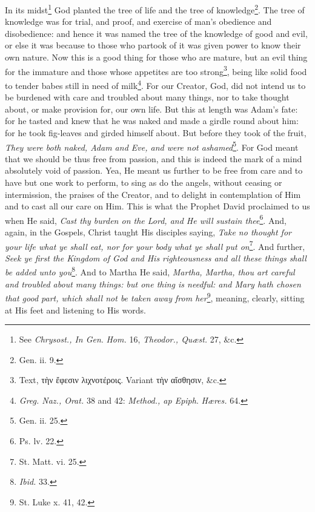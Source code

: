 In its midst\footnote{See \emph{Chrysost., In Gen}. \emph{Hom. }16, \emph{Theodor., Quæst.} 27, \&c.} God planted the tree of life and the tree of knowledge\footnote{Gen. ii. 9.}. The tree of knowledge was for trial, and proof, and exercise of man’s obedience and disobedience: and hence it was named the tree of the knowledge of good and evil, or else it was because to those who partook of it was given power to know their own nature. Now this is a good thing for those who are mature, but an evil thing for the immature and those whose appetites are too strong\footnote{Text, \textgreek{τὴν ἔφεσιν λιχνοτέροις}. Variant \textgreek{τὴν αἴσθησιν}, \&c.}, being like solid food to tender babes still in need of milk\footnote{\emph{Greg. Naz., Orat. }38 and 42: \emph{Method., ap Epiph}. \emph{Hæres. }64.}. For our Creator, God, did not intend us to be burdened with care and troubled about many things, nor to take thought about, or make provision for, our own life. But this at length was Adam’s fate: for he tasted and knew that he was naked and made a girdle round about him: for he took fig-leaves and girded himself about. But before they took of the fruit, \emph{They were both naked, Adam and Eve, and were not ashamed}\footnote{Gen. ii. 25.}. For God meant that we should be thus free from passion, and this is indeed the mark of a mind absolutely void of passion. Yea, He meant us further to be free from care and to have but one work to perform, to sing as do the angels, without ceasing or intermission, the praises of the Creator, and to delight in contemplation of Him and to cast all our care on Him. This is what the Prophet David proclaimed to us when He said, \emph{Cast thy burden on the Lord, and He will sustain thee}\footnote{Ps. lv. 22.}. And, again, in the Gospels, Christ taught His disciples saying, \emph{Take no thought for your life what ye shall eat, nor for your body what ye shall put on}\footnote{St. Matt. vi. 25.}. And further, \emph{Seek ye first the Kingdom of God and His righteousness and all these things shall be added unto you}\footnote{\emph{Ibid.} 33.}. And to Martha He said, \emph{Martha, Martha, thou art careful and troubled about many things: but one thing is needful: and Mary hath chosen that good part, which shall not be taken away from her}\footnote{St. Luke x. 41, 42.}, meaning, clearly, sitting at His feet and listening to His words.

